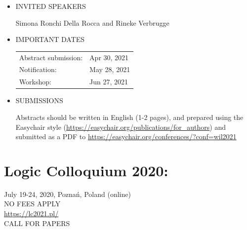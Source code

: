 \documentclass[prodmode,acmtecs]{acmsmall} %
\begin{document}
\begin{itemize}
\item INVITED SPEAKERS 
 
  Simona Ronchi Della Rocca and Rineke Verbrugge 
 
\item  IMPORTANT DATES 
 
\begin{tabulary}{\linewidth}{LL}Abstract submission:  & Apr 30, 2021 \\
Notification:  & May 28, 2021 \\
Workshop:  & Jun 27, 2021 \\
\end{tabulary}
 
\item  SUBMISSIONS 
 
  Abstracts should be written in English (1-2 pages), and prepared using the Easychair style (\href{https://easychair.org/publications/for_authors}{https://easychair.org/publications/for\_authors}) and submitted as a PDF to \href{https://easychair.org/conferences/?conf=wil2021}{https://easychair.org/conferences/?conf=wil2021} 
 
\end{itemize}\section{Logic Colloquium 2020:}\label{LogicColloquium2020}  July 19-24, 2020, Poznań, Poland (online)\\ 
  NO FEES APPLY\\ 
  \href{https://lc2021.pl/}{https://lc2021.pl/}\\ 
CALL FOR PAPERS 
\end{document}
